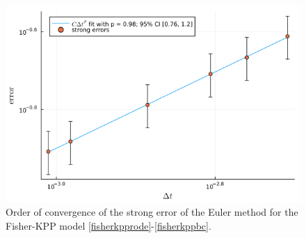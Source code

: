 \documentclass[reqno,12pt]{amsart}
\theoremstyle{plain} %
\theoremstyle{definition} %
\begin{document}
\begin{figure}[htb]
    \includegraphics[scale=0.6]{img/order_fisherkpp.png}
    \caption{Order of convergence of the strong error of the Euler method for the Fisher-KPP model \eqref{fisherkpprode}-\eqref{fisherkppbc}.}
    \label{figfisherkpp}
\end{figure}
\end{document}
